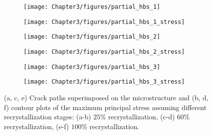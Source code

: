 \begin{figure}[htbp!]
  \centering
  \begin{subfigure}[t]{0.35\linewidth}
    \centering
    \texttt{[image: Chapter3/figures/partial\_hbs\_1]}
    \caption{}
  \end{subfigure}
  \begin{subfigure}[t]{0.35\linewidth}
    \centering
    \texttt{[image: Chapter3/figures/partial\_hbs\_1\_stress]}
    \caption{}
  \end{subfigure}
  
  \begin{subfigure}[t]{0.35\linewidth}
    \centering
    \texttt{[image: Chapter3/figures/partial\_hbs\_2]}
    \caption{}
  \end{subfigure}
  \begin{subfigure}[t]{0.35\linewidth}
    \centering
    \texttt{[image: Chapter3/figures/partial\_hbs\_2\_stress]}
    \caption{}
  \end{subfigure}
  
  \begin{subfigure}[t]{0.35\linewidth}
    \centering
    \texttt{[image: Chapter3/figures/partial\_hbs\_3]}
    \caption{}
  \end{subfigure}
  \begin{subfigure}[t]{0.35\linewidth}
    \centering
    \texttt{[image: Chapter3/figures/partial\_hbs\_3\_stress]}
    \caption{}
  \end{subfigure}
  \caption[Crack propagation at different recrystallization stages.]{ (a, c, e) Crack paths superimposed on the microstructure and (b, d, f) contour plots of the maximum principal stress assuming different recrystallization stages: (a-b) $25\%$ recrystallization, (c-d) $60\%$ recrystallization, (e-f) $100\%$ recrystallization. }
  \label{fig:partial_hbs}
\end{figure}

